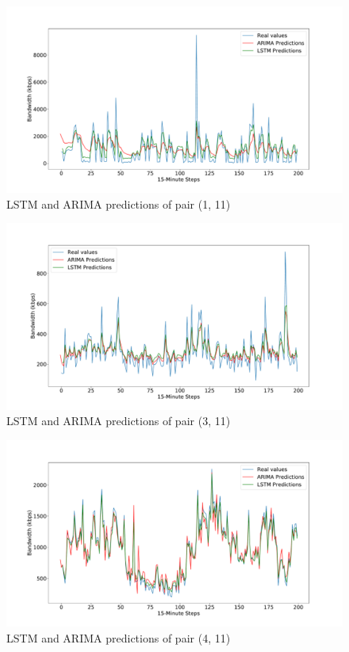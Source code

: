 \begin{figure}[H]
		\centering
		\includegraphics[width=1\linewidth]{Pictures/Practical_Examples/AvLprediction_0}
		\caption{LSTM and ARIMA predictions of pair (1, 11)}
		\label{fig:ARIMAprediction_0}
\end{figure}
\begin{figure}[H]
		\centering
		\includegraphics[width=1\linewidth]{Pictures/Practical_Examples/AvLprediction_2}
		\caption{LSTM and ARIMA predictions of pair (3, 11)}
		\label{fig:ARIMAprediction_2}
\end{figure}
\begin{figure}[H]
		\centering
		\includegraphics[width=1\linewidth]{Pictures/Practical_Examples/AvLprediction_3}
		\caption{LSTM and ARIMA predictions of pair (4, 11)}
		\label{fig:ARIMAprediction_3}
\end{figure}